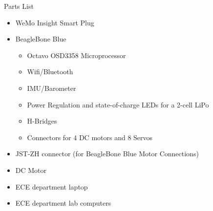 \documentclass{beamer}
\begin{document}
\begin{frame}{Parts List}{}
    \begin{itemize}
        \item WeMo Insight Smart Plug
        \item BeagleBone Blue
        \begin{itemize}
            \item Octavo OSD3358 Microprocessor
            \item Wifi/Bluetooth
            \item IMU/Barometer
            \item Power Regulation and state-of-charge LEDs for a 2-cell LiPo
            \item H-Bridges
            \item Connectors for 4 DC motors and 8 Servos
        \end{itemize}
        \item JST-ZH connector (for BeagleBone Blue Motor Connections)
        \item DC Motor
        \item ECE department laptop
        \item ECE department lab computers
    \end{itemize}
\end{frame}
\end{document}
